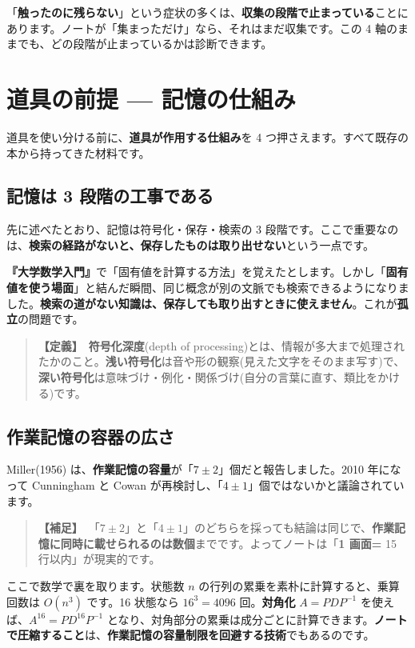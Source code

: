 \documentclass{article}
\begin{document}
「\textbf{触ったのに残らない}」という症状の多くは、\textbf{収集の段階で止まっている}ことにあります。ノートが「集まっただけ」なら、それはまだ収集です。この 4 軸のままでも、どの段階が止まっているかは診断できます。

\section{道具の前提 — 記憶の仕組み}

道具を使い分ける前に、\textbf{道具が作用する仕組み}を 4 つ押さえます。すべて既存の本から持ってきた材料です。

\subsection{記憶は 3 段階の工事である}

先に述べたとおり、記憶は符号化・保存・検索の 3 段階です。ここで重要なのは、\textbf{検索の経路がないと、保存したものは取り出せない}という一点です。

\textbf{『大学数学入門』}で「固有値を計算する方法」を覚えたとします。しかし「\textbf{固有値を使う場面}」と結んだ瞬間、同じ概念が別の文脈でも検索できるようになりました。\textbf{検索の道がない知識は、保存しても取り出すときに使えません}。これが\textbf{孤立}の問題です。

\begin{quote}
\textbf{【定義】}\ \textbf{符号化深度}(depth of processing)とは、情報が多大まで処理されたかのこと。\textbf{浅い符号化}は音や形の観察(見えた文字をそのまま写す)で、\textbf{深い符号化}は意味づけ・例化・関係づけ(自分の言葉に直す、類比をかける)です。
\end{quote}

\subsection{作業記憶の容器の広さ}

Miller(1956) は、\textbf{作業記憶の容量}が「\(7 \pm 2\)」個だと報告しました。2010 年になって Cunningham と Cowan が再検討し、「\(4 \pm 1\)」個ではないかと議論されています。

\begin{quote}
\textbf{【補足】}\ 「\(7 \pm 2\)」と「\(4 \pm 1\)」のどちらを採っても結論は同じで、\textbf{作業記憶に同時に載せられるのは数個}までです。よってノートは「\textbf{1 画面=} 15 行以内」が現実的です。
\end{quote}

ここで数学で裏を取ります。状態数 \(n\) の行列の累乗を素朴に計算すると、乗算回数は \(O(n^3)\) です。16 状態なら \(16^3 = 4096\) 回。\textbf{対角化} \(A = PDP^{-1}\) を使えば、\(A^{16} = PD^{16}P^{-1}\) となり、対角部分の累乗は成分ごとに計算できます。\textbf{ノートで圧縮すること}は、\textbf{作業記憶の容量制限を回避する技術}でもあるのです。
\end{document}
